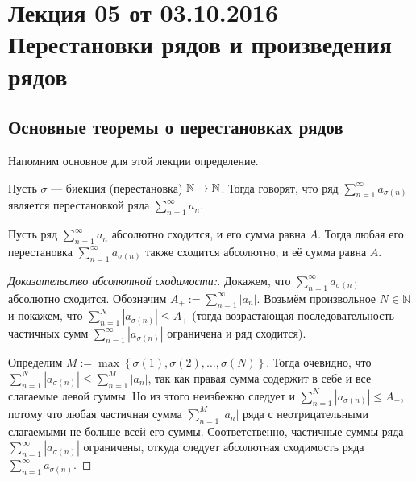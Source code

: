 \section{Лекция 05 от 03.10.2016 \\ Перестановки рядов и произведения рядов}
\subsection{Основные теоремы о перестановках рядов}
Напомним основное для этой лекции определение.
	\begin{Def}
		Пусть $\sigma$ --- биекция (перестановка) $\mathbb{N} \to \mathbb{N}$. Тогда говорят, что ряд $\sum\limits_{n=1}^{\infty}a_{\sigma(n)}$ является перестановкой ряда $\sum\limits_{n=1}^{\infty}a_n$.
	\end{Def}

	\begin{Theorem}[Коши]
		Пусть ряд $\sum\limits_{n=1}^{\infty}a_n$ абсолютно сходится, и его сумма равна $A$. Тогда любая его перестановка $\sum\limits_{n=1}^{\infty}a_{\sigma(n)}$ также сходится абсолютно, и её сумма равна $A$.
	\end{Theorem}
	\begin{proof} [Доказательство абсолютной сходимости:]  
		Докажем, что $\sum\limits_{n=1}^{\infty}a_{\sigma(n)}$ абсолютно сходится.
		Обозначим $A_+ := \sum\limits_{n=1}^{\infty}|a_n|$.
		Возьмём произвольное $N\in \mathbb{N}$ и покажем, что  $\sum\limits_{n=1}^{N}|a_{\sigma(n)}| \leq A_+$ (тогда возрастающая последовательность частичных сумм $\sum\limits_{n=1}^{\infty}|a_{\sigma(n)}|$ ограничена и ряд сходится).

		Определим $M := \max \left\{\sigma(1), \sigma(2), \dots, \sigma(N)\right\}$.  Тогда очевидно, что $\sum\limits_{n=1}^{N}|a_{\sigma(n)}| \leq \sum\limits_{n=1}^{M}|a_{n}|$, так как правая сумма содержит в себе и все слагаемые левой суммы. Но из этого неизбежно следует и  $\sum\limits_{n=1}^{N}|a_{\sigma(n)}| \leq A_+$, потому что любая частичная сумма $\sum\limits_{n=1}^{M}|a_{n}|$ ряда с неотрицательными слагаемыми не больше всей его суммы. Соответственно, частичные суммы ряда $\sum\limits_{n=1}^{\infty}|a_{\sigma(n)}|$ ограничены, откуда следует абсолютная сходимость ряда $\sum\limits_{n=1}^{\infty}a_{\sigma(n)}$.
	\end{proof}
